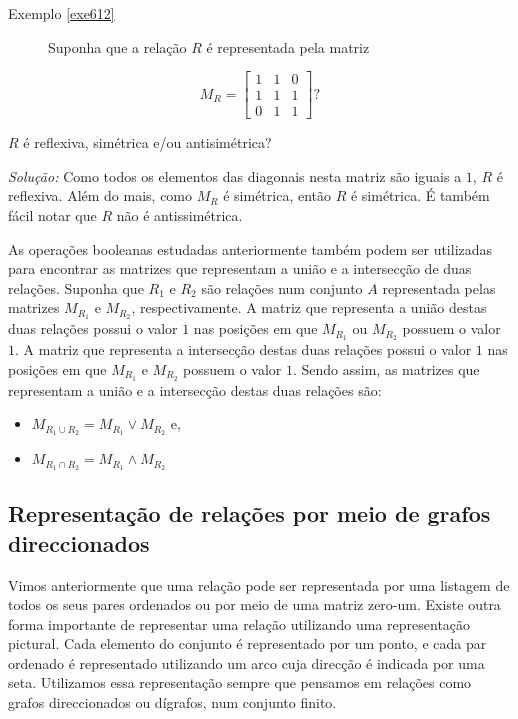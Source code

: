 \begin{description}
	\item[Exemplo \ref{exe612}]{Suponha que a relação $R$ é representada pela
	matriz}
\end{description}
\[
	M_R = \begin{bmatrix}
	1 & 1 & 0\\
	1 & 1 & 1\\
	0 & 1 & 1
	\end{bmatrix}?
\]

$R$ é reflexiva, simétrica e/ou antisimétrica?

\emph{Solução:} Como todos os elementos das diagonais nesta matriz são iguais a
$1$, $R$ é reflexiva.
Além do mais, como $M_R$ é simétrica, então $R$ é simétrica. É também fácil
notar que $R$ não é antissimétrica.

As operações booleanas estudadas anteriormente também podem ser utilizadas para
encontrar as matrizes que representam a união e a intersecção de duas relações.
Suponha que $R_1$ e $R_2$ são relações num conjunto $A$ representada pelas
matrizes $M_{R_1}$ e $M_{R_2}$, respectivamente. A matriz que representa a
união destas duas relações possui o valor $1$ nas posições em que  $M_{R_1}$ ou
$M_{R_2}$ possuem o valor $1$. A matriz que representa a intersecção destas
duas relações possui o valor $1$ nas posições em que  $M_{R_1}$ e $M_{R_2}$
possuem o valor $1$.
Sendo assim, as matrizes que representam a união e a intersecção destas duas
relações são:

\begin{itemize}
  \item $M_{R_1 \cup R_2} = M_{R_1} \lor M_{R_2}$ e,
  \item $M_{R_1 \cap R_2} = M_{R_1} \land M_{R_2}$
\end{itemize}


\subsection{Representação de relações por meio de grafos direccionados}

Vimos anteriormente que uma relação pode ser representada por uma listagem de
todos os seus pares ordenados ou por meio de uma matriz zero-um. Existe outra
forma importante de representar uma relação utilizando uma representação
pictural. Cada elemento do conjunto é representado por um ponto, e cada par
ordenado é representado utilizando um arco cuja direcção é indicada por uma
seta.
Utilizamos essa representação sempre que pensamos em relações como grafos
direccionados ou dígrafos, num conjunto finito.


